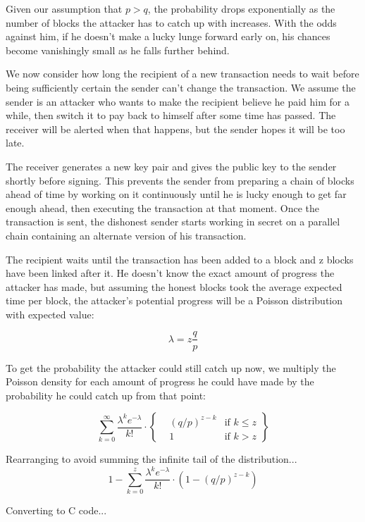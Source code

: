 \documentclass{article}
\begin{document}
Given our assumption that $p > q$, the probability drops exponentially as the number of blocks the
attacker has to catch up with increases. With the odds against him, if he doesn't make a lucky
lunge forward early on, his chances become vanishingly small as he falls further behind.

We now consider how long the recipient of a new transaction needs to wait before being
sufficiently certain the sender can't change the transaction. We assume the sender is an attacker
who wants to make the recipient believe he paid him for a while, then switch it to pay back to
himself after some time has passed. The receiver will be alerted when that happens, but the
sender hopes it will be too late.

The receiver generates a new key pair and gives the public key to the sender shortly before
signing. This prevents the sender from preparing a chain of blocks ahead of time by working on
it continuously until he is lucky enough to get far enough ahead, then executing the transaction at
that moment. Once the transaction is sent, the dishonest sender starts working in secret on a
parallel chain containing an alternate version of his transaction.

The recipient waits until the transaction has been added to a block and z blocks have been
linked after it. He doesn't know the exact amount of progress the attacker has made, but
assuming the honest blocks took the average expected time per block, the attacker's potential
progress will be a Poisson distribution with expected value:

\[
    \lambda = z \frac{q}{p}
\]

To get the probability the attacker could still catch up now, we multiply the Poisson density for
each amount of progress he could have made by the probability he could catch up from that point:

\[
    \sum_{k = 0}^{\infty} {
        \frac{\lambda^k e^{-\lambda}}{k!} \cdot
        \left\{\begin{aligned}
        & {(q / p)}^{z-k} & \text{if } k \le z \\
        &  1  & \text{if } k > z
        \end{aligned}\right\}
    }
\]

Rearranging to avoid summing the infinite tail of the distribution...
\[
    1 - \sum_{k = 0}^{z} {
        \frac{\lambda^k e^{-\lambda}}{k!} \cdot \left(1 - {(q / p)}^{z-k} \right)
    }
\]

Converting to C code... \\
\end{document}
